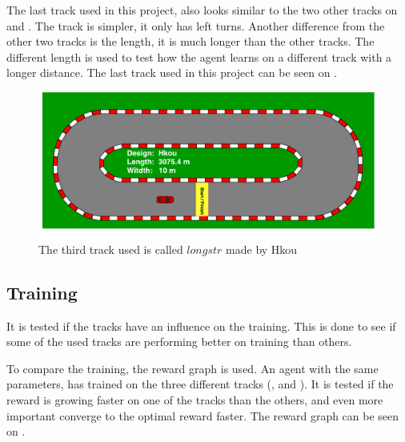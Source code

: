 The last track used in this project, also looks similar to the two other tracks on  and . The track is simpler, it only has left turns. Another difference from the other two tracks is the length, it is much longer than the other tracks. The different length is used to test how the agent learns on a different track with a longer distance. The last track used in this project can be seen on .

\begin{figure}[H]
	\centering
	\includegraphics[width=1\textwidth]{Figures/Result/track_longstr.pdf}
	\caption{The third track used is called $longstr$ made by Hkou}
	\label{fig:track_longstr}
\end{figure}


\subsection*{Training}
It is tested if the tracks have an influence on the training. This is done to see if some of the used tracks are performing better on training than others. 

To compare the training, the reward graph is used. An agent with the same parameters, has trained on the three different tracks (,  and ). It is tested if the reward is growing faster on one of the tracks than the others, and even more important converge to the optimal reward faster. The reward graph can be seen on . 

